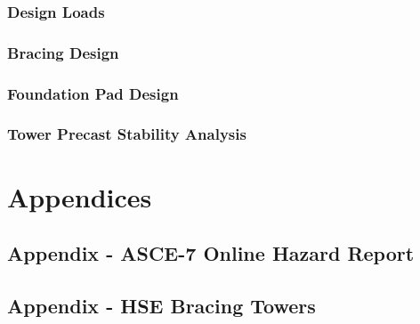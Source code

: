 \documentclass[11pt,letterpaper]{report}
\begin{document}
\subsection{Design Loads}
% 
\subsection{Bracing Design}
% 
\subsection{Foundation Pad Design}
% 
\subsection{Tower Precast Stability Analysis}
% 





\setcounter{section}{0}
\renewcommand{\thepage}{}
\renewcommand{\thesection}{}


\chapter*{Appendices}
\setcounter{page}{1}
\renewcommand{\thepage}{\Alph{section}-\arabic{page}}

\section{Appendix  - ASCE-7 Online Hazard Report}
% 

\setcounter{page}{1}
\section{Appendix  - HSE Bracing Towers}
% 
% 
%
\end{document}
